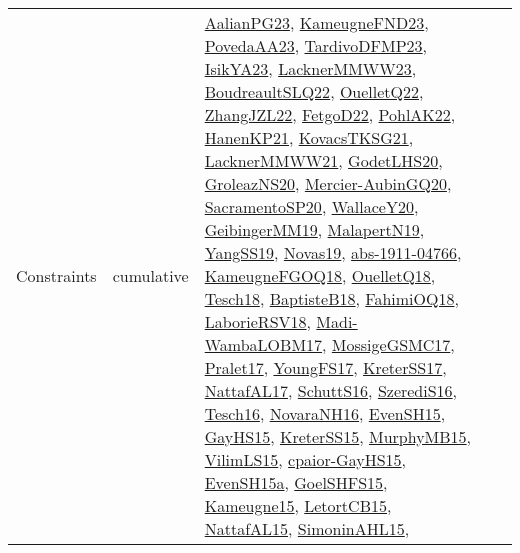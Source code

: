 {\begin{longtable}{lp{3cm}>{\raggedright}p{6cm}>{\raggedright}p{6cm}p{8cm}}
Constraints & cumulative & \href{papers/AalianPG23.pdf}{AalianPG23}\cite{AalianPG23}, \href{papers/KameugneFND23.pdf}{KameugneFND23}\cite{KameugneFND23}, \href{papers/PovedaAA23.pdf}{PovedaAA23}\cite{PovedaAA23}, \href{papers/TardivoDFMP23.pdf}{TardivoDFMP23}\cite{TardivoDFMP23}, \href{articles/IsikYA23.pdf}{IsikYA23}\cite{IsikYA23}, \href{articles/LacknerMMWW23.pdf}{LacknerMMWW23}\cite{LacknerMMWW23}, \href{papers/BoudreaultSLQ22.pdf}{BoudreaultSLQ22}\cite{BoudreaultSLQ22}, \href{papers/OuelletQ22.pdf}{OuelletQ22}\cite{OuelletQ22}, \href{papers/ZhangJZL22.pdf}{ZhangJZL22}\cite{ZhangJZL22}, \href{articles/FetgoD22.pdf}{FetgoD22}\cite{FetgoD22}, \href{articles/PohlAK22.pdf}{PohlAK22}\cite{PohlAK22}, \href{papers/HanenKP21.pdf}{HanenKP21}\cite{HanenKP21}, \href{papers/KovacsTKSG21.pdf}{KovacsTKSG21}\cite{KovacsTKSG21}, \href{papers/LacknerMMWW21.pdf}{LacknerMMWW21}\cite{LacknerMMWW21}, \href{papers/GodetLHS20.pdf}{GodetLHS20}\cite{GodetLHS20}, \href{papers/GroleazNS20.pdf}{GroleazNS20}\cite{GroleazNS20}, \href{papers/Mercier-AubinGQ20.pdf}{Mercier-AubinGQ20}\cite{Mercier-AubinGQ20}, \href{articles/SacramentoSP20.pdf}{SacramentoSP20}\cite{SacramentoSP20}, \href{articles/WallaceY20.pdf}{WallaceY20}\cite{WallaceY20}, \href{papers/GeibingerMM19.pdf}{GeibingerMM19}\cite{GeibingerMM19}, \href{papers/MalapertN19.pdf}{MalapertN19}\cite{MalapertN19}, \href{papers/YangSS19.pdf}{YangSS19}\cite{YangSS19}, \href{articles/Novas19.pdf}{Novas19}\cite{Novas19}, \href{articles/abs-1911-04766.pdf}{abs-1911-04766}\cite{abs-1911-04766}, \href{papers/KameugneFGOQ18.pdf}{KameugneFGOQ18}\cite{KameugneFGOQ18}, \href{papers/OuelletQ18.pdf}{OuelletQ18}\cite{OuelletQ18}, \href{papers/Tesch18.pdf}{Tesch18}\cite{Tesch18}, \href{articles/BaptisteB18.pdf}{BaptisteB18}\cite{BaptisteB18}, \href{articles/FahimiOQ18.pdf}{FahimiOQ18}\cite{FahimiOQ18}, \href{articles/LaborieRSV18.pdf}{LaborieRSV18}\cite{LaborieRSV18}, \href{papers/Madi-WambaLOBM17.pdf}{Madi-WambaLOBM17}\cite{Madi-WambaLOBM17}, \href{papers/MossigeGSMC17.pdf}{MossigeGSMC17}\cite{MossigeGSMC17}, \href{papers/Pralet17.pdf}{Pralet17}\cite{Pralet17}, \href{papers/YoungFS17.pdf}{YoungFS17}\cite{YoungFS17}, \href{articles/KreterSS17.pdf}{KreterSS17}\cite{KreterSS17}, \href{articles/NattafAL17.pdf}{NattafAL17}\cite{NattafAL17}, \href{papers/SchuttS16.pdf}{SchuttS16}\cite{SchuttS16}, \href{papers/SzerediS16.pdf}{SzerediS16}\cite{SzerediS16}, \href{papers/Tesch16.pdf}{Tesch16}\cite{Tesch16}, \href{articles/NovaraNH16.pdf}{NovaraNH16}\cite{NovaraNH16}, \href{papers/EvenSH15.pdf}{EvenSH15}\cite{EvenSH15}, \href{papers/GayHS15.pdf}{GayHS15}\cite{GayHS15}, \href{papers/KreterSS15.pdf}{KreterSS15}\cite{KreterSS15}, \href{papers/MurphyMB15.pdf}{MurphyMB15}\cite{MurphyMB15}, \href{papers/VilimLS15.pdf}{VilimLS15}\cite{VilimLS15}, \href{papers/cpaior-GayHS15.pdf}{cpaior-GayHS15}\cite{cpaior-GayHS15}, \href{articles/EvenSH15a.pdf}{EvenSH15a}\cite{EvenSH15a}, \href{articles/GoelSHFS15.pdf}{GoelSHFS15}\cite{GoelSHFS15}, \href{articles/Kameugne15.pdf}{Kameugne15}\cite{Kameugne15}, \href{articles/LetortCB15.pdf}{LetortCB15}\cite{LetortCB15}, \href{articles/NattafAL15.pdf}{NattafAL15}\cite{NattafAL15}, \href{articles/SimoninAHL15.pdf}{SimoninAHL15}\cite{SimoninAHL15}, 
\end{longtable}}
